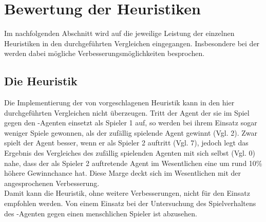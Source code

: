 \section{Bewertung der Heuristiken}
\authormax
\label{sect:Fazit:Heuristiken}
Im nachfolgenden Abschnitt wird auf die jeweilige Leistung der einzelnen Heuristiken in den durchgeführten Vergleichen eingegangen. Insbesondere bei der  werden dabei mögliche Verbesserungsmöglichkeiten besprochen.  
\subsection{Die Heuristik }
Die Implementierung der von \cite{nijssen_2007} vorgeschlagenen Heuristik kann in den hier durchgeführten Vergleichen nicht überzeugen. Tritt der Agent der sie im Spiel gegen den -Agenten einsetzt als Spieler 1 auf, so werden bei ihrem Einsatz sogar weniger Spiele gewonnen, als der zufällig spielende Agent gewinnt (Vgl. 2). Zwar spielt der Agent besser, wenn er als Spieler 2 auftritt (Vgl. 7), jedoch legt das Ergebnis des Vergleiches des zufällig spielenden Agenten mit sich selbst (Vgl. 0) nahe, dass der als Spieler 2 auftretende Agent im Wesentlichen eine um rund 10\% höhere Gewinnchance hat. Diese Marge deckt sich im Wesentlichen mit der angesprochenen Verbesserung.
\\Damit kann die Heuristik, ohne weitere Verbesserungen, nicht für den Einsatz empfohlen werden. Von einem Einsatz bei der Untersuchung des Spielverhaltens des \mxZitat{\abp}-Agenten gegen einen menschlichen Spieler ist abzusehen. 
